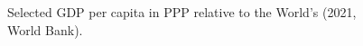 \documentclass[12pt,english]{article}
\begin{document}


\begin{figure}[h!]
  \caption{Selected GDP per capita in PPP relative to the World's (2021, World Bank).}\label{fig:GDPpc}
\end{figure}
\end{document}
